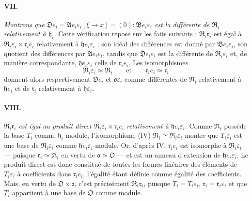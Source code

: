 \paragraph{VII.}
\emph{Montrons que $\mathfrak D e_i=\mathfrak A e_i\varepsilon_i[\xi\to x]=(0):\mathfrak B e_i\varepsilon_i$ est la différente de $\mathfrak R_i$ relativement à $\mathfrak h_i$.} Cette vérification repose sur les faits suivants : $\mathfrak R_i\mathfrak r_i$ est égal à $\mathfrak R_i\varepsilon_i\times\mathfrak r_i e_i$ relativement à $\mathfrak h e_i\varepsilon_i$ ; son idéal des différences est donné par $\mathfrak B e_i\varepsilon_i$, son quotient des différences par $\mathfrak A e_i\varepsilon_i$, tandis que $\mathfrak D e_i\varepsilon_i$ est la différente de $\mathfrak R_i\varepsilon_i$ et, de manière correspondante, $\mathfrak d e_i\varepsilon_i$ celle de $\mathfrak r_i e_i$. Les isomorphismes
\[
\mathfrak R_i\varepsilon_i\simeq\mathfrak R_i
\qquad\text{et}\qquad
\mathfrak r_i e_i\simeq\mathfrak r_i
\]
donnent alors respectivement $\mathfrak D e_i$ et $\mathfrak d\varepsilon_i$ comme différentes de $\mathfrak R_i$ relativement à $\mathfrak h e_i$ et de $\mathfrak r_i$ relativement à $\mathfrak h\varepsilon_i$.

\paragraph{VIII.}
\emph{$\mathfrak R_i\mathfrak r_i$ est égal au produit direct $\mathfrak R_i\varepsilon_i\times\mathfrak r_i e_i$ relativement à $\mathfrak h e_i\varepsilon_i$.} Comme $\mathfrak R_i$ possède la base $T_i$ comme $\mathfrak h_i$-module, l'isomorphisme (IV) $\mathfrak R_i\simeq\mathfrak R_i\varepsilon_i$ montre que $T_i\varepsilon_i$ est une base de $\mathfrak R_i\varepsilon_i$ comme $\mathfrak h e_i\varepsilon_i$-module. Or, d'après IV, $\mathfrak r_i e_i$ est isomorphe à $\mathfrak R_i\varepsilon_i$ --- puisque $\mathfrak r_i\simeq\mathfrak R_i$ en vertu de $\mathfrak o\simeq\mathfrak O$ --- et est un anneau d'extension de $\mathfrak h e_i\varepsilon_i$. Le produit direct est donc constitué de toutes les formes linéaires des éléments de $T_i\varepsilon_i$ à coefficients dans $\mathfrak r_i e_i$, l'égalité étant définie comme égalité des coefficients. Mais, en vertu de $\mathfrak O\times\mathfrak o$, c'est précisément $\mathfrak R_i\mathfrak r_i$, puisque $T_i=T_i e_i$, $\mathfrak r_i=\mathfrak r_i\varepsilon_i$ et que $T_i$ appartient à une base de $\mathfrak O$ comme module.

